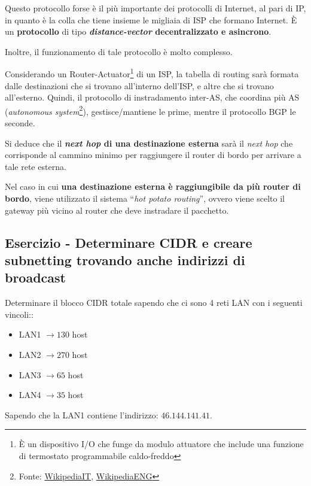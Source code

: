 \documentclass[a4paper]{article}
\newcommand{\dquotes}[1]{``#1''}
\begin{document}
	\noindent
	Questo protocollo forse è il più importante dei protocolli di Internet, al pari di IP, in quanto è la colla che tiene insieme le migliaia di ISP che formano Internet. È un \textbf{protocollo} di tipo \textbf{\emph{distance-vector} decentralizzato e asincrono}.\newline
	
	\noindent
	Inoltre, il funzionamento di tale protocollo è molto complesso.\newline
	
	\noindent
	Considerando un Router-Actuator\footnote{È un dispositivo I/O che funge da modulo attuatore che include una funzione di termostato programmabile caldo-freddo} di un ISP, la tabella di routing sarà formata dalle destinazioni che si trovano all'interno dell'ISP, e altre che si trovano all'esterno. Quindi, il protocollo di instradamento inter-AS, che coordina più AS (\emph{autonomous system}\footnote{Fonte: \href{https://it.wikipedia.org/wiki/Sistema_autonomo}{WikipediaIT}, \href{https://en.wikipedia.org/wiki/Autonomous_system_(Internet)}{WikipediaENG}}), gestisce/mantiene le prime, mentre il protocollo BGP le seconde.\newline
	
	\noindent
	Si deduce che il \textbf{\emph{next hop} di una destinazione esterna} sarà il \emph{next hop} che corrisponde al cammino minimo per raggiungere il router di bordo per arrivare a tale rete esterna.\newline
	
	\noindent
	Nel caso in cui \textbf{una destinazione esterna è raggiungibile da più router di bordo}, viene utilizzato il sistema \dquotes{\emph{hot potato routing}}, ovvero viene scelto il gateway più vicino al router che deve instradare il pacchetto.\newpage
	
	\subsection{\textcolor{Red3}{Esercizio - Determinare CIDR e creare subnetting trovando anche indirizzi di broadcast}}
	
	Determinare il blocco \textsf{CIDR} totale sapendo che ci sono 4 reti \textsf{LAN} con i seguenti vincoli::
	\begin{itemize}
		\item \textsf{LAN1} $\longrightarrow 130$ host
		\item \textsf{LAN2} $\longrightarrow 270$ host
		\item \textsf{LAN3} $\longrightarrow 65$ host
		\item \textsf{LAN4} $\longrightarrow 35$ host
	\end{itemize}
	Sapendo che la \textsf{LAN1} contiene l'indirizzo: $46.144.141.41$.\newline
	
\end{document}
